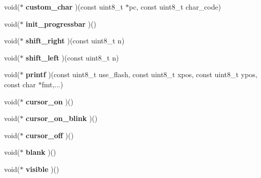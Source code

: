 \begin{DoxyCompactItemize}
\item 
\hypertarget{structlcd__struct_a8d1a7ca80f24c7fa8e4c92965eaef083}{void($\ast$ {\bfseries custom\-\_\-char} )(const uint8\-\_\-t $\ast$pc, const uint8\-\_\-t char\-\_\-code)}\label{structlcd__struct_a8d1a7ca80f24c7fa8e4c92965eaef083}

\item 
\hypertarget{structlcd__struct_a7af72fbaeb315942e02271702b022a49}{void($\ast$ {\bfseries init\-\_\-progressbar} )()}\label{structlcd__struct_a7af72fbaeb315942e02271702b022a49}

\item 
\hypertarget{structlcd__struct_a2877762132ee3cc5772e4018d1afbe9d}{void($\ast$ {\bfseries shift\-\_\-right} )(const uint8\-\_\-t n)}\label{structlcd__struct_a2877762132ee3cc5772e4018d1afbe9d}

\item 
\hypertarget{structlcd__struct_a9678d8f375b098f04811447d34282a58}{void($\ast$ {\bfseries shift\-\_\-left} )(const uint8\-\_\-t n)}\label{structlcd__struct_a9678d8f375b098f04811447d34282a58}

\item 
\hypertarget{structlcd__struct_a511a8844d410f63c59feede3e57f3771}{void($\ast$ {\bfseries printf} )(const uint8\-\_\-t use\-\_\-flash, const uint8\-\_\-t xpos, const uint8\-\_\-t ypos, const char $\ast$fmt,...)}\label{structlcd__struct_a511a8844d410f63c59feede3e57f3771}

\item 
\hypertarget{structlcd__struct_a16c570daa5b24fc504ef52c442bd7581}{void($\ast$ {\bfseries cursor\-\_\-on} )()}\label{structlcd__struct_a16c570daa5b24fc504ef52c442bd7581}

\item 
\hypertarget{structlcd__struct_a24cdf9182b18538306adf4c8ad797b8c}{void($\ast$ {\bfseries cursor\-\_\-on\-\_\-blink} )()}\label{structlcd__struct_a24cdf9182b18538306adf4c8ad797b8c}

\item 
\hypertarget{structlcd__struct_aa7fd7dbc773d158972e23caea1c01006}{void($\ast$ {\bfseries cursor\-\_\-off} )()}\label{structlcd__struct_aa7fd7dbc773d158972e23caea1c01006}

\item 
\hypertarget{structlcd__struct_a2e2e6487158d3c33fe63ce68bc7a3790}{void($\ast$ {\bfseries blank} )()}\label{structlcd__struct_a2e2e6487158d3c33fe63ce68bc7a3790}

\item 
\hypertarget{structlcd__struct_ad985756510bf2bc0e39f0fbfa4070786}{void($\ast$ {\bfseries visible} )()}\label{structlcd__struct_ad985756510bf2bc0e39f0fbfa4070786}


\end{DoxyCompactItemize}
